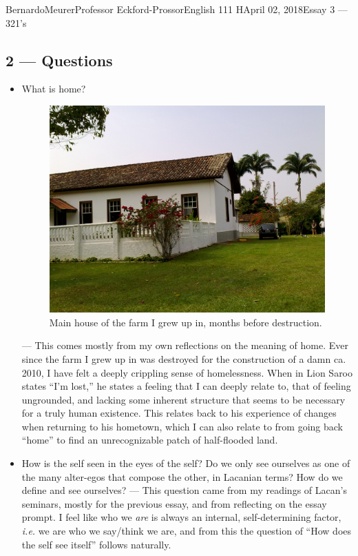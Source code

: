 \documentclass[12pt,letterpaper]{article}
\begin{document}
\begin{mla}{Bernardo}{Meurer}{Professor Eckford-Prossor}{English 111 H}{April 02, 2018}{Essay 3 --- 321's}
	\subsection*{2 --- Questions}
	\begin{itemize}
		\item What is home?
		      \begin{figure}[H]
			      \includegraphics{./farm.jpg}
			      \caption{Main house of the farm I grew up in, months before destruction.}
		      \end{figure}
		      --- This comes mostly from my own reflections on the meaning of home. Ever since the farm I grew up in was destroyed for the construction of a damn ca. 2010, I have felt a deeply crippling sense of homelessness.
		      When in Lion Saroo states ``I'm lost,'' he states a feeling that I can deeply relate to, that of feeling ungrounded, and lacking some inherent structure that seems to be necessary for a truly human existence. This relates back to his experience of changes when returning to his hometown, which I can also relate to from going back ``home'' to find an unrecognizable patch of half-flooded land.

		\item How is the self seen in the eyes of the self? Do we only see ourselves as one of the many alter-egos that compose the other, in Lacanian terms? How do we define and see ourselves? --- This question came from my readings of Lacan's seminars, mostly for the previous essay, and from reflecting on the essay prompt.
		      I feel like who we \emph{are} is always an internal, self-determining factor, \emph{i.e.} we are who we say/think we are, and from this the question of ``How does the self see itself'' follows naturally.
	\end{itemize}

\end{mla}
\end{document}
